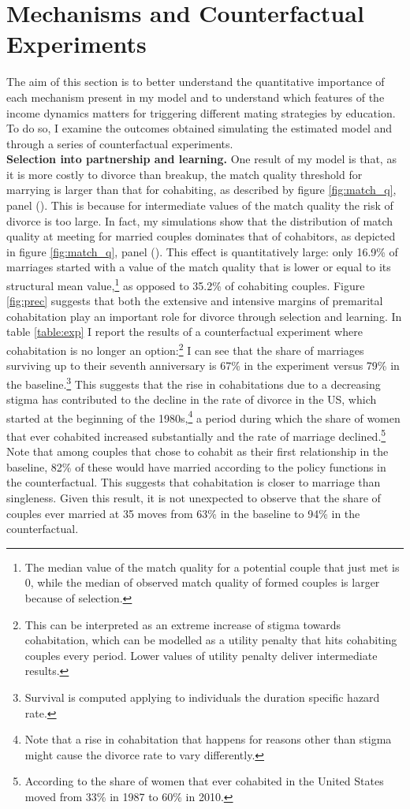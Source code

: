 \documentclass[12pt]{article}
\begin{document}
\section{Mechanisms and Counterfactual Experiments}
The aim of this section is to better understand the quantitative importance of each mechanism present in my model  and to understand which features of the income dynamics matters for triggering different mating strategies by education. To do so, I examine the outcomes obtained simulating the estimated model and through a series of counterfactual experiments.\\
\textbf{Selection into partnership and learning.} One result of my model is that, as it is more costly to divorce than breakup, the match quality threshold for marrying is larger than that for cohabiting, as described by figure \ref{fig:match_q}, panel (). This is because for intermediate values of the match quality the risk of divorce is too large. In fact, my simulations show that the distribution of match quality at meeting for married couples dominates that of cohabitors, as depicted in figure \ref{fig:match_q}, panel (). This effect is quantitatively large: only 16.9\% of marriages started with a value of the match quality that is lower or equal to its structural mean value,\footnote{The median value of the match quality for a potential couple that just met is 0, while the median of observed match quality of formed couples is larger because of selection.} as opposed to 35.2\% of cohabiting couples. Figure \ref{fig:prec} suggests that both the extensive and intensive margins of premarital cohabitation play an important role for divorce through selection and learning. In table \ref{table:exp} I report the results of a counterfactual experiment where cohabitation is no longer an option:\footnote{This can be interpreted as an extreme increase of stigma towards cohabitation, which can be modelled as a utility penalty that hits cohabiting couples every period. Lower values of utility penalty deliver intermediate results.} I can see that the share of marriages surviving up to their seventh anniversary is 67\% in the experiment versus 79\% in the baseline.\footnote{Survival is computed applying to individuals the duration specific hazard rate.} This suggests that the rise in cohabitations due to a decreasing stigma has contributed to the decline in the rate of divorce in the US, which started at the beginning of the 1980s,\footnote{Note that a rise in cohabitation that happens for reasons other than stigma might cause the divorce rate to vary differently.} a period during which the share of women that ever cohabited increased substantially and the rate of marriage declined.\footnote{According to \cite{manning2013} the share of women that ever cohabited in the United States moved from 33\% in 1987 to 60\% in 2010.} Note that among couples that chose to cohabit as their first relationship in the baseline, 82\% of these would have married according to the policy functions in the counterfactual. This suggests that cohabitation is closer to marriage than singleness. Given this result, it is not unexpected to observe that the share of couples ever married at 35 moves from 63\% in the baseline to 94\% in the counterfactual.
\end{document}

